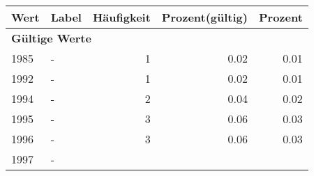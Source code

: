      \begin{longtable}{lXrrr}
     \toprule
     \textbf{Wert} & \textbf{Label} & \textbf{Häufigkeit} & \textbf{Prozent(gültig)} & \textbf{Prozent} \\
     \endhead
     \midrule
     \multicolumn{5}{l}{\textbf{Gültige Werte}}\\

     1985 &
     \multicolumn{1}{X}{ -  } &


       \num{1} &
       \num[round-mode=places,round-precision=2]{0.02} &
         \num[round-mode=places,round-precision=2]{0.01} \\

     1992 &
     \multicolumn{1}{X}{ -  } &


       \num{1} &
       \num[round-mode=places,round-precision=2]{0.02} &
         \num[round-mode=places,round-precision=2]{0.01} \\

     1994 &
     \multicolumn{1}{X}{ -  } &


       \num{2} &
       \num[round-mode=places,round-precision=2]{0.04} &
         \num[round-mode=places,round-precision=2]{0.02} \\

     1995 &
     \multicolumn{1}{X}{ -  } &


       \num{3} &
       \num[round-mode=places,round-precision=2]{0.06} &
         \num[round-mode=places,round-precision=2]{0.03} \\

     1996 &
     \multicolumn{1}{X}{ -  } &


       \num{3} &
       \num[round-mode=places,round-precision=2]{0.06} &
         \num[round-mode=places,round-precision=2]{0.03} \\

     1997 &
     \multicolumn{1}{X}{ -  } &



\end{longtable}
